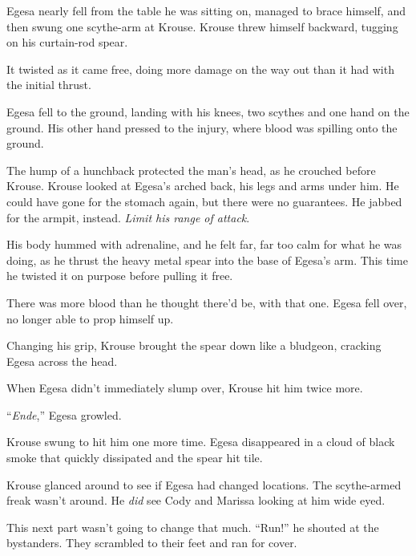 Egesa nearly fell from the table he was sitting on, managed to brace himself, and then swung one scythe-arm at Krouse.  Krouse threw himself backward, tugging on his curtain-rod spear.



It twisted as it came free, doing more damage on the way out than it had with the initial thrust.



Egesa fell to the ground, landing with his knees, two scythes and one hand on the ground. His other hand pressed to the injury, where blood was spilling onto the ground.



The hump of a hunchback protected the man's head, as he crouched before Krouse.  Krouse looked at Egesa's arched back, his legs and arms under him.  He could have gone for the stomach again, but there were no guarantees.  He jabbed for the armpit, instead.  \emph{Limit his range of attack}.



His body hummed with adrenaline, and he felt far, far too calm for what he was doing, as he thrust the heavy metal spear into the base of Egesa's arm.  This time he twisted it on purpose before pulling it free.



There was more blood than he thought there'd be, with that one.  Egesa fell over, no longer able to prop himself up.



Changing his grip, Krouse brought the spear down like a bludgeon, cracking Egesa across the head.



When Egesa didn't immediately slump over, Krouse hit him twice more.



``\emph{Ende},'' Egesa growled.



Krouse swung to hit him one more time.  Egesa disappeared in a cloud of black smoke that quickly dissipated and the spear hit tile.



Krouse glanced around to see if Egesa had changed locations.  The scythe-armed freak wasn't around.  He \emph{did} see Cody and Marissa looking at him wide eyed.



This next part wasn't going to change that much.  ``Run!'' he shouted at the bystanders.  They scrambled to their feet and ran for cover.




